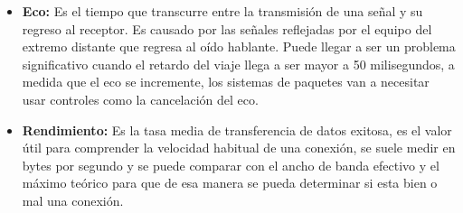 \documentclass[a4paper,12pt]{article}
\begin{document}
\begin{itemize}
    \item \textbf{Eco: }Es el tiempo que transcurre entre la transmisión de una señal y su regreso al receptor. Es causado por las señales reflejadas por el equipo del extremo distante que regresa al oído hablante. Puede llegar a ser un problema significativo cuando el retardo del viaje llega a ser mayor a 50 milisegundos, a medida que el eco se incremente, los sistemas de paquetes van a necesitar usar controles como la cancelación del eco.
    \item \textbf{Rendimiento: }Es la tasa media de transferencia de datos exitosa, es el valor útil para comprender la velocidad habitual de una conexión, se suele medir en bytes por segundo y se puede comparar con el ancho de banda efectivo y el máximo teórico para que de esa manera se pueda determinar si esta bien o mal una conexión.
    
\end{itemize}




 
\end{document}
